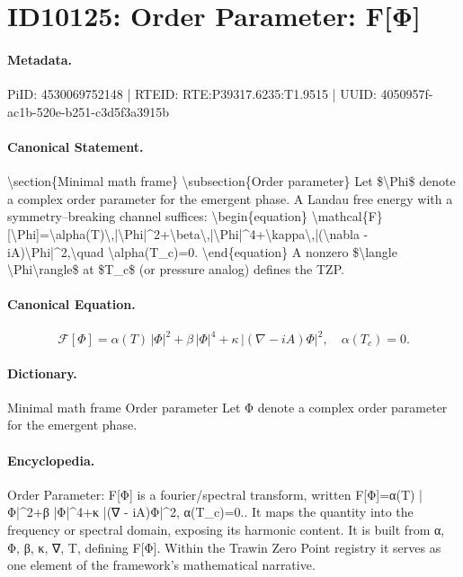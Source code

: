 \section*{ID10125: Order Parameter: F[Φ]}
\paragraph{Metadata.}
PiID: 4530069752148 | RTEID: RTE:P39317.6235:T1.9515 | UUID: 4050957f-ac1b-520e-b251-c3d5f3a3915b

\paragraph{Canonical Statement.}
\textbackslash{}section\{Minimal math frame\} \textbackslash{}subsection\{Order parameter\} Let \$\textbackslash{}Phi\$ denote a complex order parameter for the emergent phase. A Landau free energy with a symmetry--breaking channel suffices: \textbackslash{}begin\{equation\} \textbackslash{}mathcal\{F\}[\textbackslash{}Phi]=\textbackslash{}alpha(T)\textbackslash{},|\textbackslash{}Phi|\textasciicircum{}2+\textbackslash{}beta\textbackslash{},|\textbackslash{}Phi|\textasciicircum{}4+\textbackslash{}kappa\textbackslash{},|(\textbackslash{}nabla - iA)\textbackslash{}Phi|\textasciicircum{}2,\textbackslash{}quad \textbackslash{}alpha(T\_c)=0. \textbackslash{}end\{equation\} A nonzero \$\textbackslash{}langle \textbackslash{}Phi\textbackslash{}rangle\$ at \$T\_c\$ (or pressure analog) defines the TZP.

\paragraph{Canonical Equation.}
\[
\mathcal{F}[\Phi]=\alpha(T)\,|\Phi|^2+\beta\,|\Phi|^4+\kappa\,|(\nabla - iA)\Phi|^2,\quad \alpha(T_c)=0.
\]

\paragraph{Dictionary.}
Minimal math frame Order parameter Let Φ denote a complex order parameter for the emergent phase.

\paragraph{Encyclopedia.}
Order Parameter: F[Φ] is a fourier/spectral transform, written F[Φ]=α(T) |Φ|\textasciicircum{}2+β |Φ|\textasciicircum{}4+κ |(∇ - iA)Φ|\textasciicircum{}2, α(T\_c)=0.. It maps the quantity into the frequency or spectral domain, exposing its harmonic content. It is built from α, Φ, β, κ, ∇, T, defining F[Φ]. Within the Trawin Zero Point registry it serves as one element of the framework's mathematical narrative.
